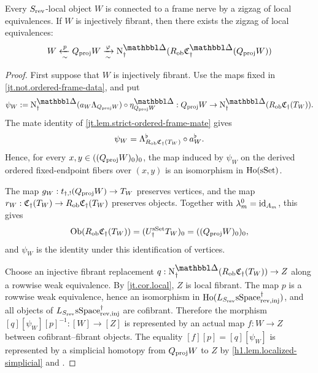 \documentclass[a4paper,dvipdfmx,11pt]{amsart}
\begin{document}
\begin{theorem}\label{jt.thm.strict}
  Every $S_{\mathrm{rev}}$-local object $W$ is connected to a frame nerve by a zigzag of local equivalences.
  If $W$ is injectively fibrant, then there exists the zigzag of local equivalences:
  \begin{align}
    W
    \xleftarrow[\sim]{p}
    Q_{\proj}W
    \xrightarrow[\sim]{\varphi}
    \N^{\prism}_{\dag}
    (R_{\rmob}\frakC^{\prism}_{\dag}(Q_{\proj}W))
  \end{align}
\end{theorem}

\begin{proof}
  First suppose that $W$ is injectively fibrant.
  Use the maps fixed in \cref{jt.not.ordered-frame-data}, and put
  \begin{align}
    \psi_W
    :=
    \N^{\prism}_{\dag}
    (a_W\Lambda_{Q_{\proj}W})
    \circ
    \eta^{\prism}_{Q_{\proj}W}:
    Q_{\proj}W
    \to
    \N^{\prism}_{\dag}
    (R_{\rmob}\frakC_{\dag}(T_W)).
  \end{align}
  The mate identity of \cref{jt.lem.strict-ordered-frame-mate} gives
  \begin{align}\label{jt.eq.psi-mate}
    \psi_W
    =
    \Lambda^{\flat}_{R_{\mathrm{ob}}\mathfrak{C}_{\dag}(T_W)}
    \circ
    a_W^{\flat}.
  \end{align}
  Hence, for every $x,y\in((Q_{\mathrm{proj}}W)_0)_0$, the map induced by $\psi_W$ on the derived ordered fixed-endpoint fibers over $(x,y)$ is an isomorphism in $\mathrm{Ho}(\mathrm{sSet})$.

  The map $g_W:t_{\dag,!}(Q_{\mathrm{proj}}W)\to T_W$ preserves vertices, and the map $r_W: \mathfrak{C}_{\dag}(T_W) \to R_{\mathrm{ob}}\mathfrak{C}_{\dag}(T_W)$ preserves objects.
  Together with $\lambda_m^0=\operatorname{id}_{A_m}$, this gives
  \begin{align}
    \operatorname{Ob}(R_{\mathrm{ob}}\mathfrak{C}_{\dag}(T_W))
    =
    (U_{\dag}^{\mathrm{sSet}} T_W)_0
    =
    ((Q_{\mathrm{proj}}W)_0)_0,
  \end{align}
  and $\psi_W$ is the identity under this identification of vertices.

  Choose an injective fibrant replacement $q : \N^{\prism}_{\dag}(R_{\rmob}\frakC_{\dag}(T_W)) \to Z$ along a rowwise weak equivalence.
  By \cref{jt.cor.local}, $Z$ is local fibrant.
  The map $p$ is a rowwise weak equivalence, hence an isomorphism in $\mathrm{Ho} (L_{S_{\mathrm{rev}}}\mathrm{sSpace}^{\dag}_{\mathrm{rev},\mathrm{inj}})$, and all objects of $L_{S_{\mathrm{rev}}}\mathrm{sSpace}^{\dag}_{\mathrm{rev},\mathrm{inj}}$ are cofibrant.
  Therefore the morphism $[q][\psi_W][p]^{-1} : [W] \to [Z]$ is represented by an actual map $f:W\to Z$ between cofibrant--fibrant objects.
  The equality $[f][p] = [q][\psi_W]$ is represented by a simplicial homotopy from $Q_{\mathrm{proj}}W$ to $Z$ by \cref{h1.lem.localized-simplicial} and \cite[Proposition~9.5.24 (2)]{Hir02}.


\end{proof}
\end{document}
